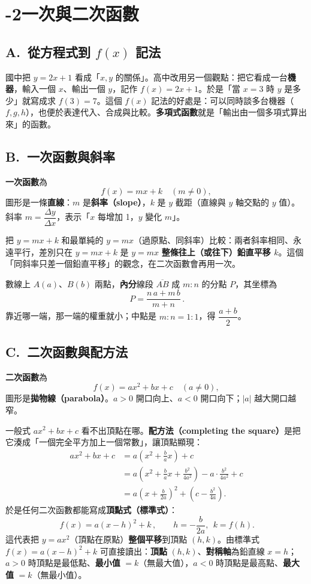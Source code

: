 \documentclass[11pt]{article}
\begin{document}
\section*{-2\quad 一次與二次函數}

\subsection*{\sffamily A.\ 從方程式到 $f(x)$ 記法}

國中把 $y=2x+1$ 看成「$x,y$ 的關係」。高中改用另一個觀點：把它看成一台\textbf{機器}，輸入一個 $x$、輸出一個 $y$，記作 $f(x)=2x+1$。於是「當 $x=3$ 時 $y$ 是多少」就寫成求 $f(3)=7$。這個 $f(x)$ 記法的好處是：可以同時談多台機器（$f,g,h$），也便於表達代入、合成與比較。\textbf{多項式函數}就是「輸出由一個多項式算出來」的函數。

\subsection*{\sffamily B.\ 一次函數與斜率}

\textbf{一次函數}為
$$f(x)=mx+k\quad(m\neq 0),$$
圖形是一條\textbf{直線}：$m$ 是\textbf{斜率（slope）}，$k$ 是 $y$ 截距（直線與 $y$ 軸交點的 $y$ 值）。斜率 $m=\dfrac{\Delta y}{\Delta x}$，表示「$x$ 每增加 1，$y$ 變化 $m$」。

把 $y=mx+k$ 和最單純的 $y=mx$（過原點、同斜率）比較：兩者斜率相同、永遠平行，差別只在 $y=mx+k$ 是 $y=mx$ \textbf{整條往上（或往下）鉛直平移 $k$}。這個「同斜率只差一個鉛直平移」的觀念，在二次函數會再用一次。

\medskip
數線上 $A(a)$、$B(b)$ 兩點，\textbf{內分}線段 $\overline{AB}$ 成 $m:n$ 的分點 $P$，其坐標為
$$\boxed{\,P=\frac{n\,a+m\,b}{m+n}\,}.$$
靠近哪一端，那一端的權重就小；中點是 $m:n=1:1$，得 $\dfrac{a+b}{2}$。

\subsection*{\sffamily C.\ 二次函數與配方法}

\textbf{二次函數}為
$$f(x)=ax^2+bx+c\quad(a\neq 0),$$
圖形是\textbf{拋物線（parabola）}。$a>0$ 開口向上、$a<0$ 開口向下；$|a|$ 越大開口越窄。

一般式 $ax^2+bx+c$ 看不出頂點在哪。\textbf{配方法（completing the square）}是把它湊成「一個完全平方加上一個常數」，讓頂點顯現：
$$
\begin{aligned}
ax^2+bx+c
&= a\!\left(x^2+\tfrac{b}{a}x\right)+c\\
&= a\!\left(x^2+\tfrac{b}{a}x+\tfrac{b^2}{4a^2}\right)-a\cdot\tfrac{b^2}{4a^2}+c\\
&= a\!\left(x+\tfrac{b}{2a}\right)^2+\left(c-\tfrac{b^2}{4a}\right).
\end{aligned}
$$
於是任何二次函數都能寫成\textbf{頂點式（標準式）}：
$$\boxed{\,f(x)=a(x-h)^2+k\,},\qquad h=-\frac{b}{2a},\ \ k=f(h).$$
這代表把 $y=ax^2$（頂點在原點）\textbf{整個平移}到頂點 $(h,k)$。由標準式 $f(x)=a(x-h)^2+k$ 可直接讀出：\textbf{頂點} $(h,k)$、\textbf{對稱軸}為鉛直線 $x=h$；$a>0$ 時頂點是最低點、\textbf{最小值} $=k$（無最大值），$a<0$ 時頂點是最高點、\textbf{最大值} $=k$（無最小值）。
\end{document}
